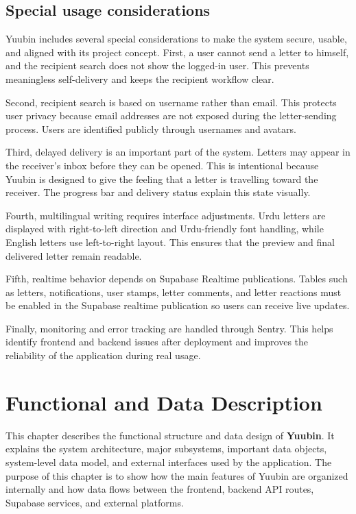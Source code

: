 ﻿\documentclass[12pt,a4paper]{report}
\begin{document}
\section{Special usage considerations}

Yuubin includes several special considerations to make the system secure, usable, and aligned with its project concept. First, a user cannot send a letter to himself, and the recipient search does not show the logged-in user. This prevents meaningless self-delivery and keeps the recipient workflow clear.

Second, recipient search is based on username rather than email. This protects user privacy because email addresses are not exposed during the letter-sending process. Users are identified publicly through usernames and avatars.

Third, delayed delivery is an important part of the system. Letters may appear in the receiver's inbox before they can be opened. This is intentional because Yuubin is designed to give the feeling that a letter is travelling toward the receiver. The progress bar and delivery status explain this state visually.

Fourth, multilingual writing requires interface adjustments. Urdu letters are displayed with right-to-left direction and Urdu-friendly font handling, while English letters use left-to-right layout. This ensures that the preview and final delivered letter remain readable.

Fifth, realtime behavior depends on Supabase Realtime publications. Tables such as letters, notifications, user stamps, letter comments, and letter reactions must be enabled in the Supabase realtime publication so users can receive live updates.

Finally, monitoring and error tracking are handled through Sentry. This helps identify frontend and backend issues after deployment and improves the reliability of the application during real usage.

\clearpage

\chapter{Functional and Data Description}

This chapter describes the functional structure and data design of \textbf{Yuubin}. It explains the system architecture, major subsystems, important data objects, system-level data model, and external interfaces used by the application. The purpose of this chapter is to show how the main features of Yuubin are organized internally and how data flows between the frontend, backend API routes, Supabase services, and external platforms.
\end{document}
